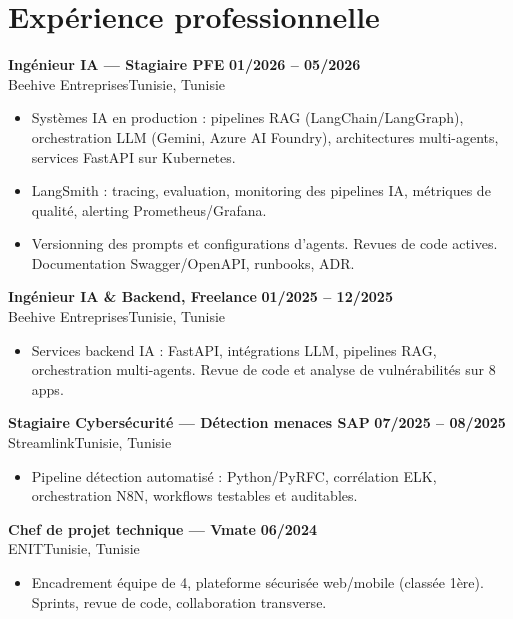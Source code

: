 \documentclass[a4paper,10pt]{article}
\newcommand{\cventry}[4]{\textbf{#1} \hfill \textbf{#4}\\[0.5pt]#2{\ifx\relax#3\relax\else, #3\fi}\par\vspace{1pt}}
\begin{document}
\section{Expérience professionnelle}
\cventry{Ingénieur IA --- Stagiaire PFE}{Beehive Entreprises}{Tunisie}{01/2026 -- 05/2026}
\begin{itemize}
  \item Systèmes IA en production : pipelines RAG (LangChain/LangGraph), orchestration LLM (Gemini, Azure AI Foundry), architectures multi-agents, services FastAPI sur Kubernetes.
  \item LangSmith : tracing, evaluation, monitoring des pipelines IA, métriques de qualité, alerting Prometheus/Grafana.
  \item Versionning des prompts et configurations d'agents. Revues de code actives. Documentation Swagger/OpenAPI, runbooks, ADR.
\end{itemize}
\cventry{Ingénieur IA \& Backend, Freelance}{Beehive Entreprises}{Tunisie}{01/2025 -- 12/2025}
\begin{itemize}
  \item Services backend IA : FastAPI, intégrations LLM, pipelines RAG, orchestration multi-agents. Revue de code et analyse de vulnérabilités sur 8 apps.
\end{itemize}
\cventry{Stagiaire Cybersécurité --- Détection menaces SAP}{Streamlink}{Tunisie}{07/2025 -- 08/2025}
\begin{itemize}
  \item Pipeline détection automatisé : Python/PyRFC, corrélation ELK, orchestration N8N, workflows testables et auditables.
\end{itemize}
\cventry{Chef de projet technique --- Vmate}{ENIT}{Tunisie}{06/2024}
\begin{itemize}
  \item Encadrement équipe de 4, plateforme sécurisée web/mobile (classée 1ère). Sprints, revue de code, collaboration transverse.
\end{itemize}
\end{document}
